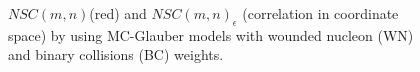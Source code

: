 	\begin{figure}[h]
		\begin{center}
        \caption{$NSC(m,n)$(red) and $NSC(m,n)_\epsilon$ (correlation in coordinate space) by using MC-Glauber models with wounded nucleon (WN) and binary collisions (BC) weights.}
        \label{fig:results_ecen}
        \end{center}   
     \end{figure}



